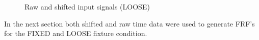 \documentclass[paper=a4, fontsize=12pt]{scrartcl} %
\begin{document}
	\begin{figure}[H]
		\centering
		\quad
		\caption{Raw and shifted input signals (LOOSE)}
		\label{fig:looseInputResponse2}
	\end{figure}
%
In the next section both shifted and raw time data were used to generate FRF's for the FIXED and LOOSE fixture condition.
%
%
\end{document}
